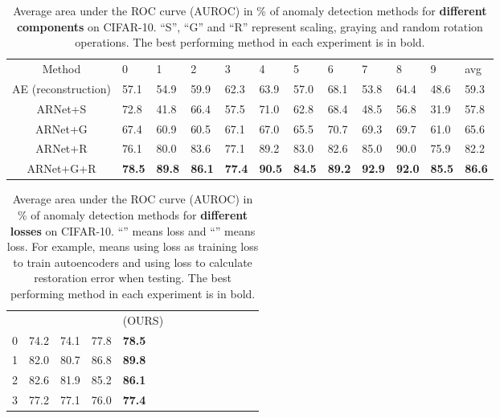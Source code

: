 \documentclass[journal]{IEEEtran}
\begin{document}
\renewcommand \arraystretch{0.95}
\begin{table*}[t]
	\centering
	\caption{Average area under the ROC curve (AUROC) in \% of anomaly detection methods for \textbf{different components} on CIFAR-10. ``S'', ``G'' and ``R'' represent scaling, graying and random rotation operations. The best performing method in each experiment is in bold.}
	\small
	\begin{tabular}{cx{0.6cm}x{0.6cm}x{0.6cm}x{0.6cm}x{0.6cm}x{0.6cm}x{0.6cm}x{0.6cm}x{0.6cm}x{0.6cm}x{0.6cm}}
		\toprule
		Method & 0 & 1 & 2 & 3 & 4 & 5 & 6 & 7 & 8 & 9 & avg\\
		\cmidrule(lr){1-1} \cmidrule(lr){2-2} \cmidrule(lr){3-3} \cmidrule(lr){4-4} \cmidrule(lr){5-5} \cmidrule(lr){6-6} \cmidrule(lr){7-7} \cmidrule(lr){8-8} \cmidrule(lr){9-9} \cmidrule(lr){10-10} \cmidrule(lr){11-11} \cmidrule(lr){12-12} 
		AE (reconstruction) & 57.1 & 54.9 & 59.9 & 62.3 & 63.9 & 57.0 & 68.1 & 53.8 & 64.4 & 48.6 & 59.3\\
		ARNet+S & 72.8 & 41.8 & 66.4 & 57.5 & 71.0 & 62.8 & 68.4 & 48.5 & 56.8 & 31.9 & 57.8\\
		ARNet+G & 67.4 & 60.9 & 60.5 & 67.1 & 67.0 & 65.5 & 70.7 & 69.3 & 69.7 & 61.0 & 65.6\\
		ARNet+R & 76.1 & 80.0 & 83.6 & 77.1 & 89.2 & 83.0 & 82.6 & 85.0 & 90.0 & 75.9 & 82.2\\
		ARNet+G+R & \textbf{78.5} & \textbf{89.8} & \textbf{86.1} & \textbf{77.4} & \textbf{90.5} & \textbf{84.5} & \textbf{89.2} & \textbf{92.9} & \textbf{92.0} & \textbf{85.5} & \textbf{86.6}\\
		\bottomrule
		\end{tabular}
	\label{tal:AUC_ablation}
\end{table*}

\renewcommand \arraystretch{0.95}
\begin{table*}[t]
    \newcommand{\tabincell}[2]{\begin{tabular}{@{}#1@{}}#2\end{tabular}}
	\centering
	\caption{Average area under the ROC curve (AUROC) in \% of anomaly detection methods for \textbf{different losses} on CIFAR-10. ``'' means  loss and ``'' means  loss. For example,  means using  loss as training loss to train autoencoders and using  loss to calculate restoration error when testing. The best performing method in each experiment is in bold.}
	\small
	\begin{tabular}{cx{1.5cm}x{1.5cm}x{1.5cm}x{2.5cm}x{0.4cm}x{0.4cm}x{0.4cm}x{0.4cm}x{0.4cm}x{0.4cm}x{0.4cm}x{0.4cm}}
		\toprule
		 &  &  &  & (OURS)\\
		\cmidrule(lr){1-1} \cmidrule(lr){2-2} \cmidrule(lr){3-3} \cmidrule(lr){4-4} \cmidrule(lr){5-5}
		0 & 74.2 & 74.1 & 77.8 & \textbf{78.5}\\
		1 & 82.0 & 80.7 & 86.8 & \textbf{89.8}\\
		2 & 82.6 & 81.9 & 85.2 & \textbf{86.1}\\
		3 & 77.2 & 77.1 & 76.0 & \textbf{77.4}\\
        \bottomrule
	\end{tabular}
	\label{tal:AUC_loss}
\end{table*}
\end{document}
